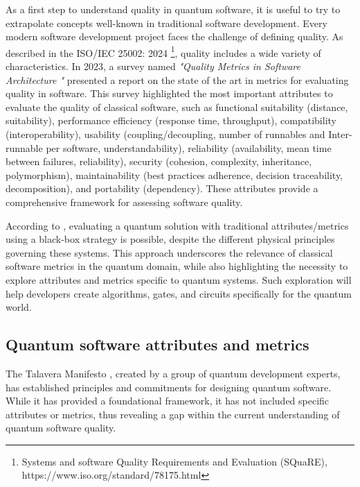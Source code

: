 As a first step to understand quality in quantum software, it is useful to try to extrapolate concepts well-known in traditional software development. Every modern software development project faces the challenge of defining quality. As described in the ISO\slash IEC 25002: 2024 \footnote{Systems and software Quality Requirements and Evaluation (SQuaRE), https://www.iso.org/standard/78175.html}, quality includes a wide variety of characteristics. %
In 2023, a survey named \textit{"Quality Metrics in Software Architecture "}\cite{Silva2023} presented a report on the state of the art in metrics for evaluating quality in software. This survey highlighted the most important attributes to evaluate the quality of classical software, such as functional suitability (distance, suitability), performance efficiency (response time, throughput), compatibility (interoperability), usability (coupling/decoupling, number of runnables and Inter-runnable per software, understandability), reliability (availability, mean time between failures, reliability), security (cohesion, complexity, inheritance, polymorphism), maintainability (best practices adherence, decision traceability, decomposition), and portability (dependency). These attributes provide a comprehensive framework for assessing software quality.

According to \cite{Gill2022}, evaluating a quantum solution with traditional attributes/metrics using a black-box strategy is possible, despite the different physical principles governing these systems. This approach underscores the relevance of classical software metrics in the quantum domain, while also highlighting the necessity to explore attributes and metrics specific to quantum systems. Such exploration will help developers create algorithms, gates, and circuits specifically for the quantum world.

\subsection{Quantum software attributes and metrics}

The Talavera Manifesto \cite{Piattini2020}, created by a group of quantum development experts, has established principles and commitments for designing quantum software. While it has provided a foundational framework, it has not included specific attributes or metrics, thus revealing a gap within the current understanding of quantum software quality.

